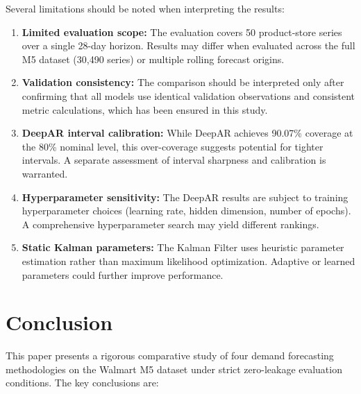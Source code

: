 \documentclass[conference]{IEEEtran}
\begin{document}
Several limitations should be noted when interpreting the results:

\begin{enumerate}
    \item \textbf{Limited evaluation scope:} The evaluation covers 50 product-store series over a single 28-day horizon. Results may differ when evaluated across the full M5 dataset (30,490 series) or multiple rolling forecast origins.

    \item \textbf{Validation consistency:} The comparison should be interpreted only after confirming that all models use identical validation observations and consistent metric calculations, which has been ensured in this study.

    \item \textbf{DeepAR interval calibration:} While DeepAR achieves 90.07\% coverage at the 80\% nominal level, this over-coverage suggests potential for tighter intervals. A separate assessment of interval sharpness and calibration is warranted.

    \item \textbf{Hyperparameter sensitivity:} The DeepAR results are subject to training hyperparameter choices (learning rate, hidden dimension, number of epochs). A comprehensive hyperparameter search may yield different rankings.

    \item \textbf{Static Kalman parameters:} The Kalman Filter uses heuristic parameter estimation rather than maximum likelihood optimization. Adaptive or learned parameters could further improve performance.
\end{enumerate}

\section{Conclusion}

This paper presents a rigorous comparative study of four demand forecasting methodologies on the Walmart M5 dataset under strict zero-leakage evaluation conditions. The key conclusions are:
\end{document}
